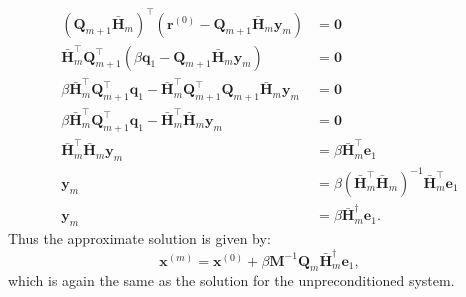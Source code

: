 \documentclass{article}
\begin{document}
\begin{appendix}
\begin{align*}
        \left( \symbf{Q}_{m+1} \bar{\symbf{H}}_m \right)^\top \left( \symbf{r}^{\left( 0 \right)} - \symbf{Q}_{m+1} \bar{\symbf{H}}_m \symbf{y}_m \right)                                                           & = \symbf{0}                                                                                             \\
        \bar{\symbf{H}}_m^\top \symbf{Q}_{m+1}^\top \left( \beta \symbf{q}_1 - \symbf{Q}_{m+1} \bar{\symbf{H}}_m \symbf{y}_m \right)                                                                                & = \symbf{0}                                                                                             \\
        \beta \bar{\symbf{H}}_m^\top \symbf{Q}_{m+1}^\top \symbf{q}_1 - \bar{\symbf{H}}_m^\top \symbf{Q}_{m+1}^\top \symbf{Q}_{m+1} \bar{\symbf{H}}_m \symbf{y}_m                                                   & = \symbf{0}                                                                                             \\
        \beta \bar{\symbf{H}}_m^\top \symbf{Q}_{m+1}^\top \symbf{q}_1 - \bar{\symbf{H}}_m^\top \bar{\symbf{H}}_m \symbf{y}_m                                                                                        & = \symbf{0}                                                                                             \\
        \bar{\symbf{H}}_m^\top \bar{\symbf{H}}_m \symbf{y}_m                                                                                                                                                        & = \beta \bar{\symbf{H}}_m^\top \symbf{e}_1                                                              \\
        \symbf{y}_m                                                                                                                                                                                                 & = \beta \left( \bar{\symbf{H}}_m^\top \bar{\symbf{H}}_m \right)^{-1} \bar{\symbf{H}}_m^\top \symbf{e}_1 \\
        \symbf{y}_m                                                                                                                                                                                                 & = \beta \bar{\symbf{H}}_m^\dagger \symbf{e}_1.
    \end{align*}
    Thus the approximate solution is given by:
    \begin{equation*}
        \symbf{x}^{\left( m \right)} = \symbf{x}^{\left( 0 \right)} + \beta \symbf{M}^{-1} \symbf{Q}_m \bar{\symbf{H}}_m^\dagger \symbf{e}_1,
    \end{equation*}
    which is again the same as the solution for the unpreconditioned system.

\end{appendix}
\end{document}
